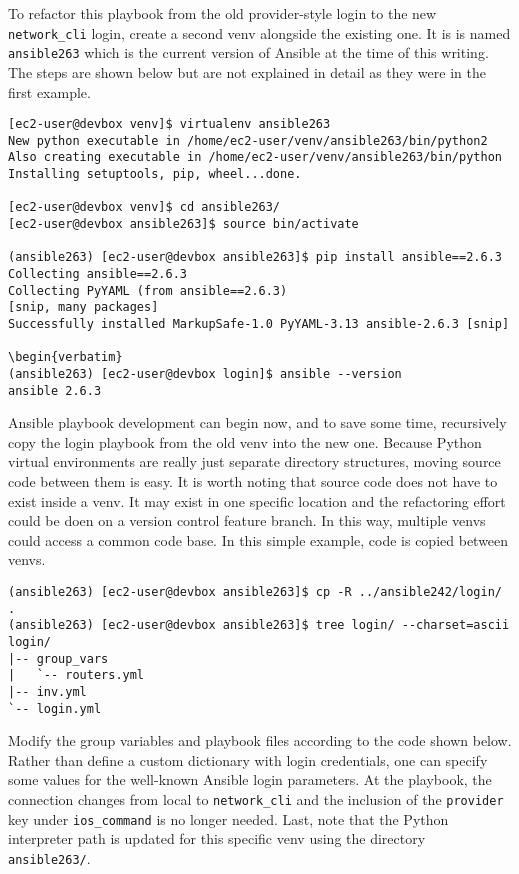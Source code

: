 To refactor this playbook from the old provider-style login to the new
\verb|network_cli| login, create a second venv alongside the existing one. It is
is named \verb|ansible263| which is the current version of Ansible at the time of
this writing. The steps are shown below but are not explained in detail as
they were in the first example.

\begin{verbatim}
[ec2-user@devbox venv]$ virtualenv ansible263
New python executable in /home/ec2-user/venv/ansible263/bin/python2
Also creating executable in /home/ec2-user/venv/ansible263/bin/python
Installing setuptools, pip, wheel...done.

[ec2-user@devbox venv]$ cd ansible263/
[ec2-user@devbox ansible263]$ source bin/activate

(ansible263) [ec2-user@devbox ansible263]$ pip install ansible==2.6.3
Collecting ansible==2.6.3
Collecting PyYAML (from ansible==2.6.3)
[snip, many packages]
Successfully installed MarkupSafe-1.0 PyYAML-3.13 ansible-2.6.3 [snip]

\begin{verbatim}
(ansible263) [ec2-user@devbox login]$ ansible --version
ansible 2.6.3
\end{verbatim}

Ansible playbook development can begin now, and to save some time, recursively
copy the login playbook from the old venv into the new one. Because Python
virtual environments are really just separate directory structures, moving
source code between them is easy. It is worth noting that source code does not
have to exist inside a venv. It may exist in one specific location and the
refactoring effort could be doen on a version control feature branch. In this
way, multiple venvs could access a common code base. In this simple example,
code is copied between venvs.

\begin{verbatim}
(ansible263) [ec2-user@devbox ansible263]$ cp -R ../ansible242/login/ .
(ansible263) [ec2-user@devbox ansible263]$ tree login/ --charset=ascii
login/
|-- group_vars
|   `-- routers.yml
|-- inv.yml
`-- login.yml
\end{verbatim}

Modify the group variables and playbook files according to the code shown
below. Rather than define a custom dictionary with login credentials, one can
specify some values for the well-known Ansible login parameters. At the
playbook, the connection changes from local to \verb|network_cli| and the inclusion
of the \verb|provider| key under \verb|ios_command| is no longer needed. Last,
note that the Python interpreter path is updated for this specific venv using
the directory \verb|ansible263/|.

